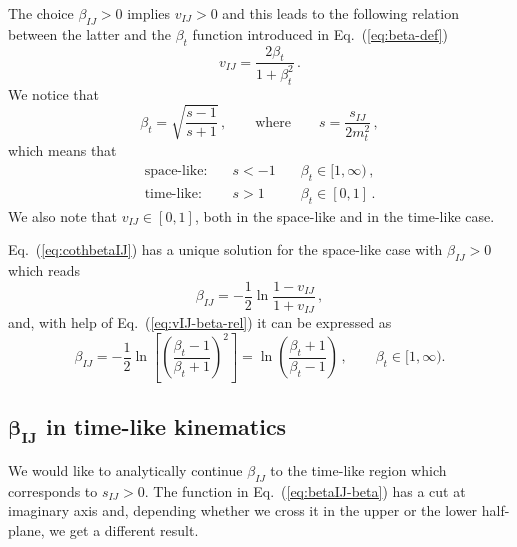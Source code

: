 \documentclass[a4paper,11pt]{article}
\newcommand{\betaIJ}{\beta_{IJ}}
\newcommand{\vIJ}{v_{IJ}}
\newcommand{\sIJ}{s_{IJ}}
\numberwithin{equation}{section}
\begin{document}
The choice $\betaIJ>0$ implies $\vIJ > 0$ and this leads to the following
relation between the latter and the $\beta_t$ function introduced in
Eq.~(\ref{eq:beta-def})
%
\begin{equation}
  \vIJ = \frac{2 \beta_t}{1+\beta^2_t}\,.
  \label{eq:vIJ-beta-rel}
\end{equation}
%
We notice that
%
\begin{equation}
  \beta_t = \sqrt{\frac{s-1}{s+1}}\,, \qquad \text{where} \qquad 
  s = \frac{\sIJ}{2 m_t^2}\,,
\end{equation}
%
which means that
%
\begin{equation}
  \begin{array}{lll}
    \text{space-like:}\quad & s < -1 \quad & \beta_t \in [1,\infty)\,, \\[0.5em]
    \text{time-like:}\quad & s > 1 \quad & \beta_t \in [0,1]\,.
  \end{array}
\end{equation}
%
We also note that $\vIJ \in [0,1]$, both in the space-like and in the time-like
case.


Eq.~(\ref{eq:cothbetaIJ}) has a unique solution for the space-like case with
$\betaIJ >0$ which reads
%
\begin{equation}
  \betaIJ =  -\frac12 \ln \frac{1-\vIJ}{1+\vIJ}\,,
  \label{eq:betaIJ-vIJ}
\end{equation}
%
and, with help of Eq.~(\ref{eq:vIJ-beta-rel}) it can be expressed as
%
\begin{equation}
 \betaIJ = -\frac12 \ln\left[\left(\frac{\beta_t-1}{\beta_t+1}\right)^2\right]
         = \ln\left(\frac{\beta_t+1}{\beta_t-1}\right)\,,
  \qquad \beta_t \in [1,\infty).
  \label{eq:betaIJ-beta}
\end{equation}

\subsection*{$\mathbold{\betaIJ}$ in time-like kinematics}
\label{sec:beta34TL}

We would like to analytically continue $\betaIJ$ to the time-like region which
corresponds to $\sIJ > 0$. The function in Eq.~(\ref{eq:betaIJ-beta}) has a cut
at imaginary axis and, depending whether we cross it in the upper or the
lower half-plane, we get a different result.
\end{document}
